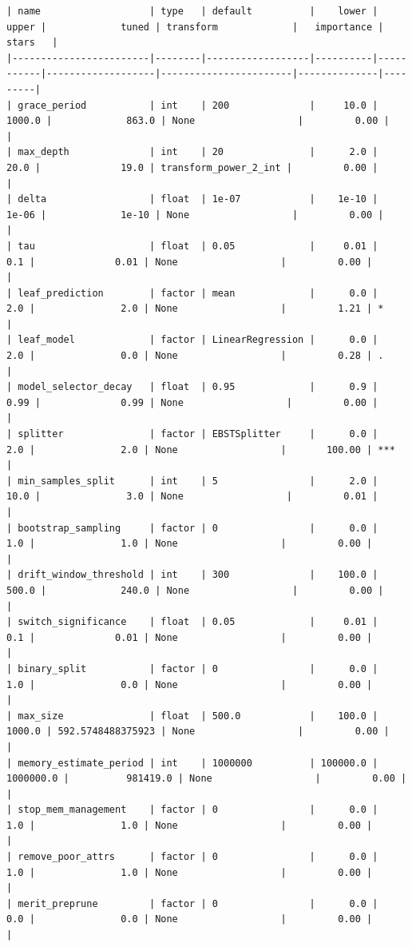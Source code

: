 \documentclass[
  letterpaper,
  DIV=11,
  numbers=noendperiod]{scrreprt}
\begin{document}
\begin{verbatim}
| name                   | type   | default          |    lower |     upper |             tuned | transform             |   importance | stars   |
|------------------------|--------|------------------|----------|-----------|-------------------|-----------------------|--------------|---------|
| grace_period           | int    | 200              |     10.0 |    1000.0 |             863.0 | None                  |         0.00 |         |
| max_depth              | int    | 20               |      2.0 |      20.0 |              19.0 | transform_power_2_int |         0.00 |         |
| delta                  | float  | 1e-07            |    1e-10 |     1e-06 |             1e-10 | None                  |         0.00 |         |
| tau                    | float  | 0.05             |     0.01 |       0.1 |              0.01 | None                  |         0.00 |         |
| leaf_prediction        | factor | mean             |      0.0 |       2.0 |               2.0 | None                  |         1.21 | *       |
| leaf_model             | factor | LinearRegression |      0.0 |       2.0 |               0.0 | None                  |         0.28 | .       |
| model_selector_decay   | float  | 0.95             |      0.9 |      0.99 |              0.99 | None                  |         0.00 |         |
| splitter               | factor | EBSTSplitter     |      0.0 |       2.0 |               2.0 | None                  |       100.00 | ***     |
| min_samples_split      | int    | 5                |      2.0 |      10.0 |               3.0 | None                  |         0.01 |         |
| bootstrap_sampling     | factor | 0                |      0.0 |       1.0 |               1.0 | None                  |         0.00 |         |
| drift_window_threshold | int    | 300              |    100.0 |     500.0 |             240.0 | None                  |         0.00 |         |
| switch_significance    | float  | 0.05             |     0.01 |       0.1 |              0.01 | None                  |         0.00 |         |
| binary_split           | factor | 0                |      0.0 |       1.0 |               0.0 | None                  |         0.00 |         |
| max_size               | float  | 500.0            |    100.0 |    1000.0 | 592.5748488375923 | None                  |         0.00 |         |
| memory_estimate_period | int    | 1000000          | 100000.0 | 1000000.0 |          981419.0 | None                  |         0.00 |         |
| stop_mem_management    | factor | 0                |      0.0 |       1.0 |               1.0 | None                  |         0.00 |         |
| remove_poor_attrs      | factor | 0                |      0.0 |       1.0 |               1.0 | None                  |         0.00 |         |
| merit_preprune         | factor | 0                |      0.0 |       0.0 |               0.0 | None                  |         0.00 |         |
\end{verbatim}
\end{document}

